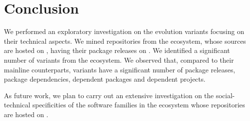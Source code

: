 \section{Conclusion}
\label{sec:conclusion}
We performed an exploratory investigation on the evolution variants focusing on their technical aspects. We mined repositories from the \js ecosystem, whose sources are hosted on \gh, having their package releases on \npm.
We identified a significant number of variants from the \js ecosystem. We observed that, compared to their mainline counterparts, variants have a significant number of package releases, package dependencies, dependent packages and dependent projects.

As future work, we plan to carry out an extensive investigation on the social-technical specificities of the software families in the \js ecosystem whose repositories are hosted on \gh. 

